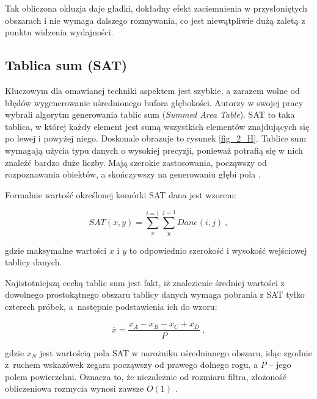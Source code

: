 	Tak obliczona okluzja daje gładki, dokładny efekt zaciemnienia w przysłoniętych obszarach i nie wymaga dalszego rozmywania, co jest niewątpliwie dużą zaletą z punktu widzenia wydajności.
	
		\subsection{Tablica sum (SAT)}
		\label{t:teoria:statvo:sat}
		
		Kluczowym dla omawianej techniki aspektem jest szybkie, a zarazem wolne od błędów wygenerowanie uśrednionego bufora głębokości. Autorzy \cite{statvo} w swojej pracy wybrali algorytm generowania tablic sum (\emph{Summed Area Table}). SAT to taka tablica, w której każdy element jest sumą wszystkich elementów znajdujących się po lewej i powyżej niego. Doskonale obrazuje to rysunek \ref{fig_2_H}. Tablice sum wymagają użycia typu danych o wysokiej precyzji, ponieważ potrafią się w nich znaleźć bardzo duże liczby. Mają szerokie zastosowania, począwszy od rozpoznawania obiektów, a skończywszy na generowaniu głębi pola \cite{sat}.
		
		
		Formalnie wartość określonej komórki SAT dana jest wzorem:
		
		\begin{equation}
		\mathit{SAT}(x, y) = \sum_{x}^{i=1}\sum_{y}^{j=1}\mathit{Dane}(i, j)\ ,
		\end{equation}
		
		gdzie maksymalne wartości \(x\) i \(y\) to odpowiednio szerokość i wysokość wejściowej tablicy danych.
		
		Najistotniejszą cechą tablic sum jest fakt, iż znalezienie średniej wartości z dowolnego prostokątnego obszaru tablicy danych wymaga pobrania z SAT tylko czterech próbek, a~następnie podstawienia ich do wzoru:
		
		\begin{equation}
		\overline{x} = \frac{x_{A} - x_{B} - x_{C} + x_{D}}{P}\ ,
		\end{equation}
		
		gdzie \(x_{N}\) jest wartością pola SAT w narożniku uśrednianego obszaru, idąc zgodnie z~ruchem wskazówek zegara począwszy od prawego dolnego rogu, a \(P\) -- jego polem powierzchni. Oznacza to, że niezależnie od rozmiaru filtra, złożoność obliczeniowa rozmycia wynosi zawsze \(O(1)\) \cite{sat}.
		
